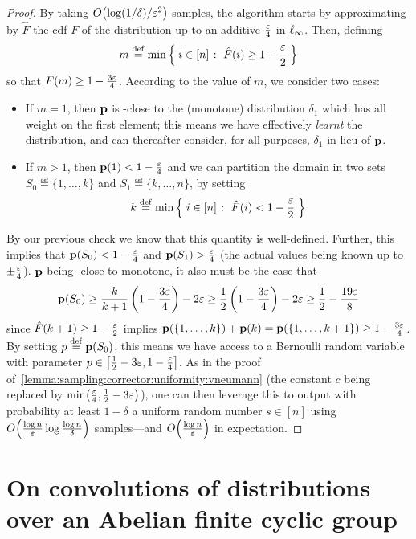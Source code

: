 \begin{proof}
By taking $\bigO{\log(1/\delta)/\eps^2}$ samples, the algorithm starts by approximating by $\hat{F}$ the cdf $F$ of the distribution up to an additive $\frac{\eps}{4}$ in $\lp[\infty]$. Then, defining
\[
    m \eqdef \min \setOfSuchThat{i \in [n]}{ \hat{F}(i) \geq 1-\frac{\eps}{2}}
\]
so that $F(m) \geq 1-\frac{3\eps}{4}$. According to the value of $m$, we consider two cases:
\begin{itemize}
  \item If $m = 1$, then $\D$ is \eps-close to the (monotone) distribution $\delta_1$ which has all weight on the first element; this means we have effectively \emph{learnt} the distribution, and can thereafter consider, for all purposes, $\delta_1$ in lieu of $\D$.  \item If $m > 1$, then $\D(1) < 1-\frac{\eps}{4}$ and we can partition the domain in two sets $S_0\eqdef\{1,\dots, k\}$ and $S_1\eqdef\{k,\dots, n\}$, by setting
\[
    k \eqdef \min \setOfSuchThat{i \in [n]}{ \hat{F}(i) < 1-\frac{\eps}{2}}
\]
\end{itemize}

By our previous check we know that this quantity is well-defined. Further, this implies that $\D(S_0) < 1-\frac{\eps}{4}$ and $\D(S_1) >\frac{\eps}{4}$  (the actual values being known up to $\pm \frac{\eps}{4}$). $\D$ being \eps-close to monotone, it also must be the case that
\[
  \D(S_0) \geq \frac{k}{k+1}\left(1-\frac{3\eps}{4}\right) - 2\eps \geq \frac{1}{2}\left(1-\frac{3\eps}{4}\right) - 2\eps \geq \frac{1}{2}-\frac{19\eps}{8}
\]
since $\hat{F}(k+1) \geq 1-\frac{\eps}{2}$ implies $\D(\{1,\dots,k\})+\D(k)=\D(\{1,\dots,k+1\}) \geq 1-\frac{3\eps}{4}$. By setting $p\eqdef \D(S_0)$, this means we have access to a Bernoulli random variable with parameter $p\in\left[\frac{1}{2}-3\eps,1-\frac{\eps}{4}\right]$. As in the proof of~\cref{lemma:sampling:corrector:uniformity:vneumann} (the constant $c$ being replaced by $\min\!\left(\frac{\eps}{4}, \frac{1}{2}-3\eps\right)$), one can then leverage this to output with probability at least $1-\delta$ a uniform random number $s\in[n]$ using $\bigO{\frac{\log n}{\eps} \log\frac{\log n}{\delta}}$ samples---and $\bigO{\frac{\log n}{\eps}}$ in expectation.
\end{proof}

\section{On convolutions of distributions over an Abelian finite cyclic group}\label{appendix:convolution:abelian}

